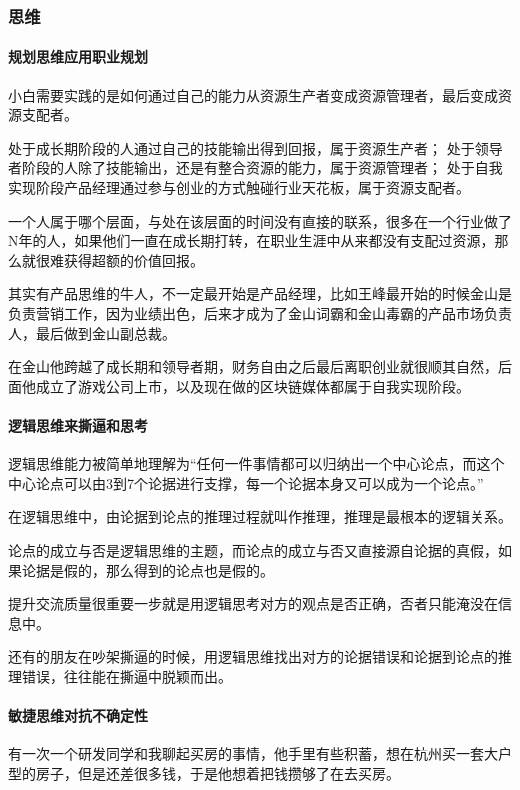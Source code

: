 \documentclass[letterpaper,11pt,english]{sphinxmanual}
\begin{document}
\subsubsection{思维}
\label{\detokenize{chapter_idea/idea:id1}}\label{\detokenize{chapter_idea/idea::doc}}

\paragraph{规划思维应用职业规划}
\label{\detokenize{chapter_idea/idea:id2}}
小白需要实践的是如何通过自己的能力从资源生产者变成资源管理者，最后变成资源支配者。

处于成长期阶段的人通过自己的技能输出得到回报，属于资源生产者；
处于领导者阶段的人除了技能输出，还是有整合资源的能力，属于资源管理者；
处于自我实现阶段产品经理通过参与创业的方式触碰行业天花板，属于资源支配者。

一个人属于哪个层面，与处在该层面的时间没有直接的联系，很多在一个行业做了N年的人，如果他们一直在成长期打转，在职业生涯中从来都没有支配过资源，那么就很难获得超额的价值回报。

其实有产品思维的牛人，不一定最开始是产品经理，比如王峰最开始的时候金山是负责营销工作，因为业绩出色，后来才成为了金山词霸和金山毒霸的产品市场负责人，最后做到金山副总裁。

在金山他跨越了成长期和领导者期，财务自由之后最后离职创业就很顺其自然，后面他成立了游戏公司上市，以及现在做的区块链媒体都属于自我实现阶段。


\paragraph{逻辑思维来撕逼和思考}
\label{\detokenize{chapter_idea/idea:id3}}
逻辑思维能力被简单地理解为“任何一件事情都可以归纳出一个中心论点，而这个中心论点可以由3到7个论据进行支撑，每一个论据本身又可以成为一个论点。”

在逻辑思维中，由论据到论点的推理过程就叫作推理，推理是最根本的逻辑关系。

论点的成立与否是逻辑思维的主题，而论点的成立与否又直接源自论据的真假，如果论据是假的，那么得到的论点也是假的。

提升交流质量很重要一步就是用逻辑思考对方的观点是否正确，否者只能淹没在信息中。

还有的朋友在吵架撕逼的时候，用逻辑思维找出对方的论据错误和论据到论点的推理错误，往往能在撕逼中脱颖而出。


\paragraph{敏捷思维对抗不确定性}
\label{\detokenize{chapter_idea/idea:id4}}
有一次一个研发同学和我聊起买房的事情，他手里有些积蓄，想在杭州买一套大户型的房子，但是还差很多钱，于是他想着把钱攒够了在去买房。
\end{document}
